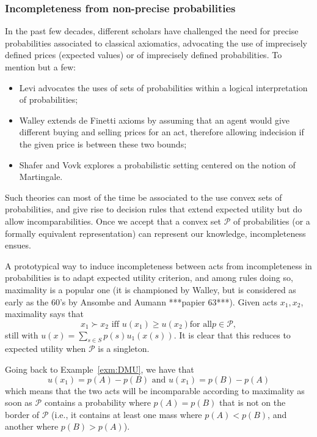 \documentclass[french, english]{llncs}
\begin{document}
	\subsubsection{Incompleteness from non-precise probabilities}
	
	In the past few decades, different scholars have challenged the need for precise probabilities associated to classical axiomatics, advocating the use of imprecisely defined prices (expected values) or of imprecisely defined probabilities. To mention but a few:
	\begin{itemize} 
		\item Levi advocates the uses of sets of probabilities within a logical interpretation of probabilities;
		\item Walley extends de Finetti axioms by assuming that an agent would give different buying and selling prices for an act, therefore allowing indecision if the given price is between these two bounds;
		\item Shafer and Vovk explores a probabilistic setting centered on the notion of Martingale.
	\end{itemize}
	Such theories can most of the time be associated to the use convex sets of probabilities, and give rise to decision rules that extend expected utility but do allow incomparabilities. Once we accept that a convex set $\mathcal{P}$ of probabilities (or a formally equivalent representation) can represent our knowledge, incompleteness ensues. 
	
	A prototypical way to induce incompleteness between acts from incompleteness in probabilities is to adapt expected utility criterion, and among rules doing so, maximality is a popular one (it is championed by Walley, but is considered as early as the 60's by Ansombe and Aumann ***papier 63***). Given acts $x_1,x_2$, maximality says that 
	$$x_1 \succ x_2 \textrm{ iff }  u(x_1) ≥ u(x_2) \textrm{for all} p \in \mathcal{P},$$
	still with $u(x) = \sum_{s \in S} p(s) u_1(x(s))$. It is clear that this reduces to expected utility when $\mathcal{P}$	is a singleton. 
	
	\begin{example}
		Going back to Example~\ref{exm:DMU}, we have that 
		$$u(x_1)=p(A) - p(B) \textrm{ and } u(x_1)=p(B) - p(A)$$
		which means that the two acts will be incomparable according to maximality as soon as $\mathcal{P}$ contains a probability where $p(A)=p(B)$ that is not on the border of $\mathcal{P}$ (i.e., it contains at least one mass where $p(A)<p(B)$, and another where $p(B)>p(A)$). 
	\end{example}
	
\end{document}
